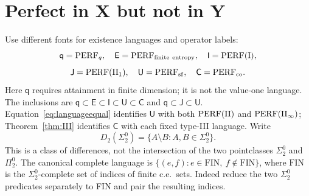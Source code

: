 
\section{Perfect in X but not in Y}\label{sec:discussion}
Use different fonts for existence languages and operator labels:
\[
 \mathsf q=\mathrm{PERF}_q,\quad \mathsf E=\mathrm{PERF}_{\rm finite\ entropy},\quad
 \mathsf I=\mathrm{PERF}(\mathrm I),
\]
\[
 \mathsf J=\mathrm{PERF}(\mathrm{II}_1),\quad \mathsf U=\mathrm{PERF}_{\mathrm{sf}},\quad
 \mathsf C=\mathrm{PERF}_{\mathrm{co}}.
\]
Here $\mathsf q$ requires attainment in finite dimension; it is not the
value-one language. The inclusions are
$\mathsf q\subset\mathsf E\subset\mathsf I\subset\mathsf U\subset\mathsf C$
and $\mathsf q\subset\mathsf J\subset\mathsf U$.
Equation~\eqref{eq:languageequal} identifies $\mathsf U$ with both
$\mathrm{PERF}(\mathrm{II})$ and $\mathrm{PERF}(\mathrm{II}_\infty)$; Theorem~\ref{thm:III}
identifies $\mathsf C$ with each fixed type-III language.
Write
\[
 D_2(\Sigma^0_2)=\{A\setminus B:A,B\in\Sigma^0_2\}.
\]
This is a class of differences, not the intersection of the two
pointclasses $\Sigma^0_2$ and $\Pi^0_2$. The canonical complete
language is $\{(e,f):e\in\mathrm{FIN},\ f\notin\mathrm{FIN}\}$,
where $\mathrm{FIN}$ is the $\Sigma^0_2$-complete set of indices
of finite c.e.\ sets. Indeed reduce the two $\Sigma^0_2$ predicates
separately to FIN and pair the resulting indices.

